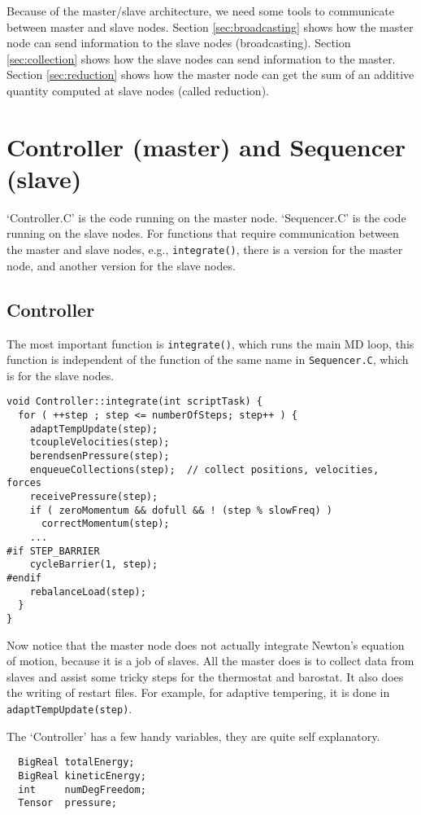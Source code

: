 \documentclass{article}
\begin{document}
Because of the master/slave architecture,
we need some tools to communicate between master and slave nodes.
%
Section \ref{sec:broadcasting} shows how the master node
can send information to the slave nodes (broadcasting).
%
Section \ref{sec:collection} shows how the slave nodes
can send information to the master.
%
Section \ref{sec:reduction} shows how the master node
can get the sum of an additive quantity
computed at slave nodes (called reduction).


\section{Controller (master) and Sequencer (slave)}

`Controller.C' is the code running on the master node.
`Sequencer.C' is the code running on the slave nodes.
For functions that require communication between
the master and slave nodes, e.g., \texttt{integrate()},
there is a version for the master node,
and another version for the slave nodes.

\subsection{Controller}

The most important function is \texttt{integrate()},
which runs the main MD loop,
this function is independent of the function of the same name
in \texttt{Sequencer.C},
which is for the slave nodes.

\begin{lstlisting}
void Controller::integrate(int scriptTask) {
  for ( ++step ; step <= numberOfSteps; step++ ) {
    adaptTempUpdate(step);
    tcoupleVelocities(step);
    berendsenPressure(step);
    enqueueCollections(step);  // collect positions, velocities, forces
    receivePressure(step);
    if ( zeroMomentum && dofull && ! (step % slowFreq) )
      correctMomentum(step);
    ...
#if STEP_BARRIER
    cycleBarrier(1, step);
#endif
    rebalanceLoad(step);
  }
}
\end{lstlisting}
%
Now notice that the master node does not actually
integrate Newton's equation of motion,
because it is a job of slaves.
%
All the master does is to collect data from slaves
and assist some tricky steps for the thermostat and barostat.
%
It also does the writing of restart files.
%
For example, for adaptive tempering,
it is done in \texttt{adaptTempUpdate(step)}.

The `Controller' has a few handy variables,
they are quite self explanatory.
\begin{lstlisting}
  BigReal totalEnergy;
  BigReal kineticEnergy;
  int     numDegFreedom;
  Tensor  pressure;
\end{lstlisting}
\end{document}
